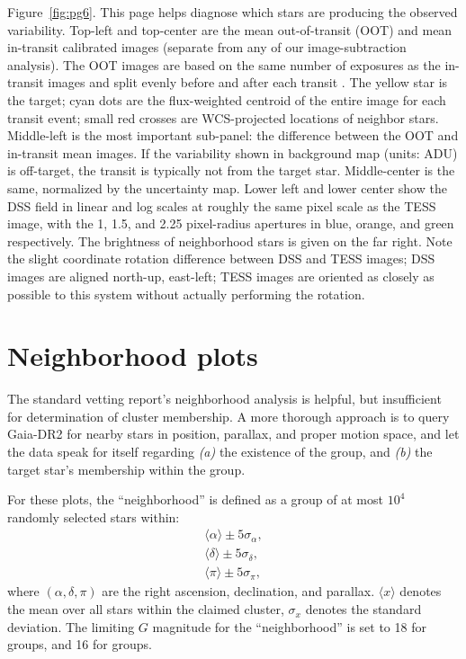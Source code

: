 \documentclass[12pt,twocolumn,tighten]{aastex62}
\begin{document}
Figure~\ref{fig:pg6}.
This page helps diagnose which stars are producing the observed
variability.  Top-left and top-center are the mean out-of-transit
(OOT) and mean in-transit calibrated images (separate from any of our
image-subtraction analysis).  The OOT images are based on the same
number of exposures as the in-transit images and split evenly before
and after each transit
\citep[following][]{bryson_identification_2013,kostov_l9859_2019}.
The yellow star is the target; cyan dots are the flux-weighted
centroid of the entire image for each transit event; small red crosses
are WCS-projected locations of neighbor stars.  Middle-left is the
most important sub-panel: the difference between the OOT and
in-transit mean images.  If the variability shown in background map
(units: ADU) is off-target, the transit is typically not from the
target star.  Middle-center is the same, normalized by the uncertainty
map.  Lower left and lower center show the DSS field in linear and log
scales at roughly the same pixel scale as the TESS image, with the 1,
1.5, and 2.25 pixel-radius apertures in blue, orange, and green
respectively.  The brightness of neighborhood stars is given on the
far right.  Note the slight coordinate rotation difference between DSS
and TESS images; DSS images are aligned north-up, east-left; TESS
images are oriented as closely as possible to this system without
actually performing the rotation.

\section{Neighborhood plots}

The standard vetting report's neighborhood
analysis is helpful, but insufficient for determination of
cluster membership.
A more thorough approach is to query Gaia-DR2 for
nearby stars in position, parallax, and proper motion space, and
let the data speak for itself regarding {\it (a)} the existence of
the group, and {\it (b)} the target star's membership within the group.

For these plots, the ``neighborhood'' is defined as a group of at
most $10^4$ randomly selected stars within:
\begin{align}
\langle \alpha \rangle \pm 5\sigma_\alpha, \\
\langle \delta \rangle \pm 5\sigma_\delta, \\
\langle \pi \rangle \pm 5\sigma_\pi,
\end{align}
where $(\alpha, \delta, \pi)$ are the right ascension,
declination, and parallax.
$\langle x \rangle$ denotes the mean over all stars within
the claimed cluster, $\sigma_x$ denotes the standard deviation.
The limiting $G$ magnitude for the ``neighborhood'' is set
to 18 for \citet{cantat-gaudin_gaia_2018} groups, and 16
for \cite{Kharchenko_et_al_2013} groups.
\end{document}

